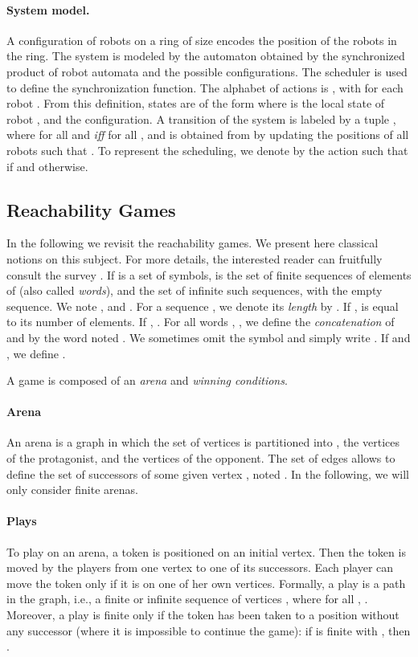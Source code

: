 \documentclass[envcountsame]{llncs} \usepackage[english]{babel}
\begin{document}
\paragraph {System model.}
A configuration of  robots on a ring of size  encodes the position of the robots in the ring.
The system is modeled by the automaton obtained
by the synchronized product of  robot automata and the possible
configurations.   The scheduler
is used to define the synchronization function.   The alphabet of
actions is , with  for each robot . From this definition, states
are of the form  where  is the local state
of robot , and  the configuration. A transition of the system is labeled by a tuple , where
 for all  and  \textit{iff} for all ,  and
 is obtained from  by updating the positions of all robots  such that
. To represent the scheduling, we denote by  the action  such that  if  and  otherwise.


\subsection{Reachability Games}
\label{sec:jeux}
In the following we revisit the reachability games. We present here classical notions on this subject.
For more details, the interested reader can fruitfully consult the survey \cite{DBLP:conf/dagstuhl/Mazala01}.
If  is a set of symbols,  is the set of finite sequences of elements of  (also called \emph{words}), and 
the set of infinite such sequences, with  the empty sequence. We note ,
and . For a sequence , we denote its \emph{length} by . If ,  is
equal to its number of elements. If , .
For all words , , we define the \emph{concatenation} of  and  by the
word noted . We sometimes omit the symbol and simply write . 
If  and , we define .

A game is composed of an \textit{arena} and \textit{winning conditions}.

\paragraph{Arena} An arena is a graph  in which the set of vertices
 is partitioned into , the vertices of the protagonist, and 
the vertices of the opponent. The set of edges  allows to
define the set of successors of some given vertex , noted . In the following, we will only consider finite arenas.

\paragraph{Plays} To play on an arena, a token is positioned on an initial vertex. Then the token is moved by 
the players from one vertex to 
one of its successors. Each player can move the token only if it is on one of her own vertices. Formally, a play is
a path in the graph, i.e., a finite or infinite sequence of vertices ,
where for all ,  . Moreover, a play is finite only if the token
has been taken to a position without any successor (where it is impossible to continue the game): 
if  is finite with , then .
\end{document}
